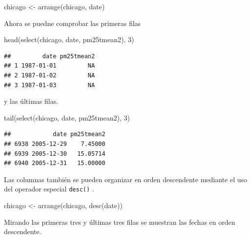 \documentclass[
]{book}
\newenvironment{Shaded}{\begin{snugshade}}{\end{snugshade}}
\newcommand{\DecValTok}[1]{\textcolor[rgb]{0.00,0.00,0.81}{#1}}
\newcommand{\FunctionTok}[1]{\textcolor[rgb]{0.00,0.00,0.00}{#1}}
\newcommand{\NormalTok}[1]{#1}
\newcommand{\OtherTok}[1]{\textcolor[rgb]{0.56,0.35,0.01}{#1}}
\begin{document}
\begin{Shaded}
\begin{Highlighting}[]
\NormalTok{chicago }\OtherTok{\textless{}{-}} \FunctionTok{arrange}\NormalTok{(chicago, date)}
\end{Highlighting}
\end{Shaded}

Ahora se puedne comprobar las primeras filas

\begin{Shaded}
\begin{Highlighting}[]
\FunctionTok{head}\NormalTok{(}\FunctionTok{select}\NormalTok{(chicago, date, pm25tmean2), }\DecValTok{3}\NormalTok{)}
\end{Highlighting}
\end{Shaded}

\begin{verbatim}
##         date pm25tmean2
## 1 1987-01-01         NA
## 2 1987-01-02         NA
## 3 1987-01-03         NA
\end{verbatim}

y las últimas filas.

\begin{Shaded}
\begin{Highlighting}[]
\FunctionTok{tail}\NormalTok{(}\FunctionTok{select}\NormalTok{(chicago, date, pm25tmean2), }\DecValTok{3}\NormalTok{)}
\end{Highlighting}
\end{Shaded}

\begin{verbatim}
##            date pm25tmean2
## 6938 2005-12-29    7.45000
## 6939 2005-12-30   15.05714
## 6940 2005-12-31   15.00000
\end{verbatim}

Las columnas también se pueden organizar en orden descendente mediante el uso del operador especial \texttt{desc()} .

\begin{Shaded}
\begin{Highlighting}[]
\NormalTok{chicago }\OtherTok{\textless{}{-}} \FunctionTok{arrange}\NormalTok{(chicago, }\FunctionTok{desc}\NormalTok{(date))}
\end{Highlighting}
\end{Shaded}

Mirando las primeras tres y últimas tres filas se muestran las fechas en orden descendente.
\end{document}
